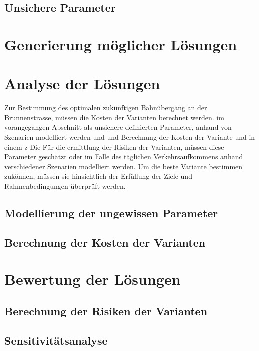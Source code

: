 
	
	\subsection{Unsichere Parameter}
	\label{subsec:Uncertain}
	



\section{Generierung möglicher Lösungen}
\label{sec:Varianten}



\section{Analyse der Lösungen}
\label{sec:Analyse}

Zur Bestimmung des optimalen zukünftigen Bahnübergang an der Brunnenstrasse, müssen die Kosten der Varianten berechnet werden. im vorangegangen Abschnitt als unsichere definierten Parameter, anhand von Szenarien modelliert werden und  und Berechnung der Kosten der Variante und in einem z Die 
Für die ermittlung der Risiken der Varianten, müssen diese Parameter geschätzt oder im Falle des täglichen Verkehrsaufkommens anhand verschiedener Szenarien modelliert werden.
Um die beste Variante bestimmen zukönnen, müssen sie hinsichtlich der Erfüllung der Ziele und Rahmenbedingungen überprüft werden. 

	\subsection{Modellierung der ungewissen Parameter}
	

	\subsection{Berechnung der Kosten der Varianten}
	



\section{Bewertung der Lösungen}
\label{sec:Bewertung}

	\subsection{Berechnung der Risiken der Varianten}
	

	\subsection{Sensitivitätsanalyse}
	

%

